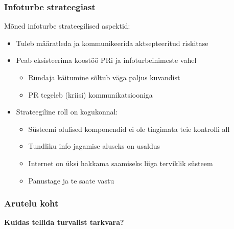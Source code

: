 \begin{frame}[fragile]
  \frametitle{Infoturbe strateegiast}
	Mõned infoturbe strateegilised aspektid:
	\begin{itemize}
		\item Tuleb määratleda ja kommunikeerida aktsepteeritud riskitase 
		\item Peab eksisteerima koostöö PRi ja infoturbeinimeste vahel
		\begin{itemize}
			\item Ründaja käitumine sõltub väga paljus kuvandist
			\item PR tegeleb (kriisi) kommunikatsiooniga
		\end{itemize}

		\item Strateegiline roll on kogukonnal:
		\begin{itemize}
			\item Süsteemi olulised komponendid ei ole tingimata teie kontrolli all
			\item Tundliku info jagamise aluseks on usaldus
			\item Internet on üksi hakkama saamiseks liiga terviklik süsteem
			\item Panustage ja te saate vastu
		\end{itemize}

	\end{itemize}
\end{frame}


\begin{frame}[fragile]
  \frametitle{Arutelu koht}
		\begin{center}
			\textbf{Kuidas tellida turvalist tarkvara?}
		\end{center}
\end{frame}


